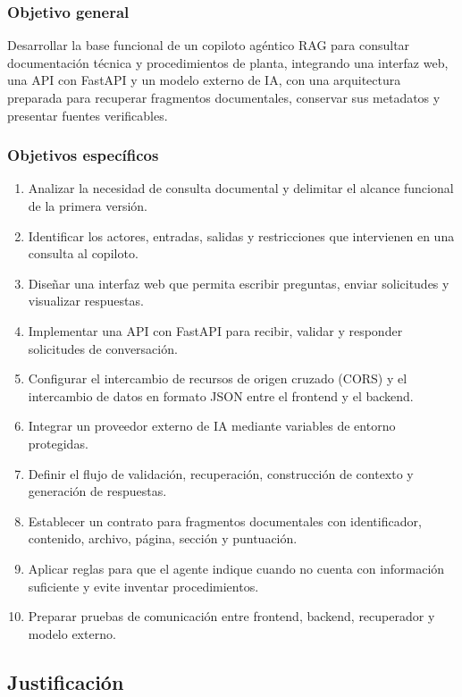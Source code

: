 \subsubsection{Objetivo general} \label{subsec:objetivo_general}
Desarrollar la base funcional de un copiloto agéntico RAG para consultar documentación técnica y procedimientos de planta, integrando una interfaz web, una API con FastAPI y un modelo externo de IA, con una arquitectura preparada para recuperar fragmentos documentales, conservar sus metadatos y presentar fuentes verificables.

\subsubsection{Objetivos específicos} \label{subsec:objetivos_especificos}
\begin{enumerate}
    \item Analizar la necesidad de consulta documental y delimitar el alcance funcional de la primera versión.
    \item Identificar los actores, entradas, salidas y restricciones que intervienen en una consulta al copiloto.
    \item Diseñar una interfaz web que permita escribir preguntas, enviar solicitudes y visualizar respuestas.
    \item Implementar una API con FastAPI para recibir, validar y responder solicitudes de conversación.
    \item Configurar el intercambio de recursos de origen cruzado (CORS) y el intercambio de datos en formato JSON entre el frontend y el backend.
    \item Integrar un proveedor externo de IA mediante variables de entorno protegidas.
    \item Definir el flujo de validación, recuperación, construcción de contexto y generación de respuestas.
    \item Establecer un contrato para fragmentos documentales con identificador, contenido, archivo, página, sección y puntuación.
    \item Aplicar reglas para que el agente indique cuando no cuenta con información suficiente y evite inventar procedimientos.
    \item Preparar pruebas de comunicación entre frontend, backend, recuperador y modelo externo.
\end{enumerate}


\subsection{Justificación} \label{sec:justificacion} %

